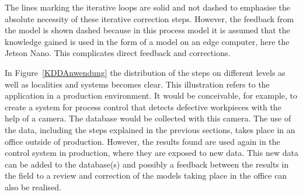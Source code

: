 The lines marking the iterative loops are solid and not dashed to emphasise the absolute necessity of these iterative correction steps. However, the feedback from the model is shown dashed because in this process model it is assumed that the knowledge gained is used in the form of a model on an edge computer, here the Jetson Nano. This complicates direct feedback and corrections.

In Figure~\ref{KDDAnwendung} the distribution of the steps on different levels as well as localities and systems becomes clear. This illustration refers to the application in a production environment. It would be conceivable, for example, to create a system for process control that detects defective workpieces with the help of a camera. The database would be collected with this camera. The use of the data, including the steps explained in the previous sections, takes place in an office outside of production. However, the results found are used again in the control system in production, where they are exposed to new data. This new data can be added to the database(s) and possibly a feedback between the results in the field to a review and correction of the models taking place in the office can also be realised.

